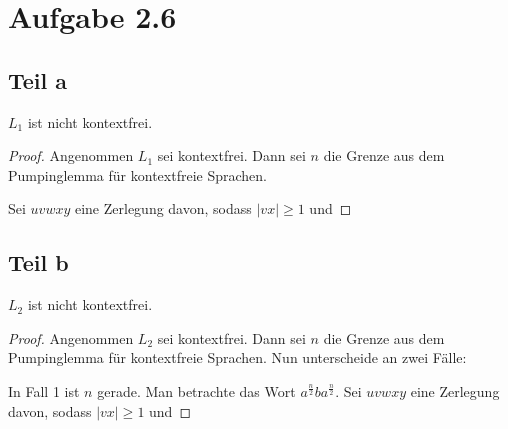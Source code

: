 \documentclass[10pt,a4paper]{article}
\begin{document}
\section{Aufgabe 2.6}

\subsection{Teil a}

$L_{1}$ ist nicht kontextfrei.
\begin{proof}
  Angenommen $L_{1}$ sei kontextfrei.
  Dann sei $n$ die Grenze aus dem Pumpinglemma für kontextfreie Sprachen.

  Sei $uvwxy$ eine Zerlegung davon, sodass $|vx| \ge 1$ und
\end{proof}

\subsection{Teil b}

$L_{2}$ ist nicht kontextfrei.
\begin{proof}
  Angenommen $L_{2}$ sei kontextfrei.
  Dann sei $n$ die Grenze aus dem Pumpinglemma für kontextfreie Sprachen.
  Nun unterscheide an zwei Fälle:

  In Fall 1 ist $n$ gerade.
  Man betrachte das Wort $a^{\frac{n}{2}}ba^{\frac{n}{2}}$.
  Sei $uvwxy$ eine Zerlegung davon, sodass $|vx| \ge 1$ und
\end{proof}
\end{document}
